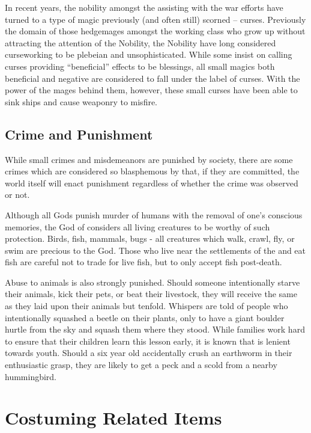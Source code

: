 \documentclass[blue]{GL2020}
\begin{document}
In recent years, the nobility amongst the \pFarm{} assisting with the war efforts have turned to a type of magic previously (and often still) scorned -- curses.  Previously the domain of those hedgemages amongst the working class who grow up without attracting the attention of the Nobility, the Nobility have long considered curseworking to be plebeian and unsophisticated.  While some insist on calling curses providing “beneficial” effects to be blessings, all small magics both beneficial and negative are considered to fall under the label of curses.  With the power of the \pFarm{} mages behind them, however, these small curses have been able to sink ships and cause \pShip{} weaponry to misfire.

\subsection*{Crime and Punishment}

While small crimes and misdemeanors are punished by society, there are some crimes which are considered so blasphemous by \cFarmGod{} that, if they are committed, the world itself will enact punishment regardless of whether the crime was observed or not.

Although all Gods punish murder of humans with the removal of one's conscious memories, the God of \pFarm{} considers all living creatures to be worthy of such protection.  Birds, fish, mammals, bugs - all creatures which walk, crawl, fly, or swim are precious to the God.  Those \pFarm{} who live near the settlements of the \pShip{} and eat fish are careful not to trade for live fish, but to only accept fish post-death.

Abuse to animals is also strongly punished.  Should someone intentionally starve their animals, kick their pets, or beat their livestock, they will receive the same as they laid upon their animals but tenfold.  Whispers are told of people who intentionally squashed a beetle on their plants, only to have a giant boulder hurtle from the sky and squash them where they stood.  While families work hard to ensure that their children learn this lesson early, it is known that \cFarmGod{} is lenient towards youth.  Should a six year old accidentally crush an earthworm in their enthusiastic grasp, they are likely to get a peck and a scold from a nearby hummingbird. 

\section*{Costuming Related Items}
\end{document}
